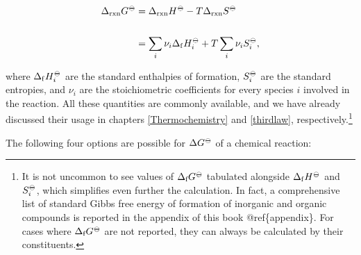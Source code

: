 \documentclass[
]{book}
\theoremstyle{definition}
\theoremstyle{definition}
\theoremstyle{definition}
\theoremstyle{remark}
\begin{document}
\begin{equation}
\begin{aligned}
\Delta_{\text{rxn}} G^{-\kern-6pt{\ominus}\kern-6pt-}&= \Delta_{\text{rxn}} H^{-\kern-6pt{\ominus}\kern-6pt-}-T \Delta_{\text{rxn}} S^{-\kern-6pt{\ominus}\kern-6pt-}\\
\\
&= \sum_i \nu_i \Delta_{\mathrm{f}} H_i^{-\kern-6pt{\ominus}\kern-6pt-}+ T \sum_i \nu_i S_i^{-\kern-6pt{\ominus}\kern-6pt-},
\end{aligned}
\label{eq:gibbseq2}
\end{equation}

where \(\Delta_{\mathrm{f}} H_i^{-\kern-6pt{\ominus}\kern-6pt-}\) are the standard enthalpies of formation, \(S_i^{-\kern-6pt{\ominus}\kern-6pt-}\) are the standard entropies, and \(\nu_i\) are the stoichiometric coefficients for every species \(i\) involved in the reaction. All these quantities are commonly available, and we have already discussed their usage in chapters \ref{Thermochemistry} and \ref{thirdlaw}, respectively.\footnote{It is not uncommon to see values of \(\Delta_{\text{f}} G^{-\kern-6pt{\ominus}\kern-6pt-}\) tabulated alongside \(\Delta_{\mathrm{f}} H^{-\kern-6pt{\ominus}\kern-6pt-}\) and \(S_i^{-\kern-6pt{\ominus}\kern-6pt-}\), which simplifies even further the calculation. In fact, a comprehensive list of standard Gibbs free energy of formation of inorganic and organic compounds is reported in the appendix of this book @ref\{appendix\}. For cases where \(\Delta_{\text{f}} G^{-\kern-6pt{\ominus}\kern-6pt-}\) are not reported, they can always be calculated by their constituents.}

The following four options are possible for \(\Delta G^{-\kern-6pt{\ominus}\kern-6pt-}\) of a chemical reaction:
\end{document}
